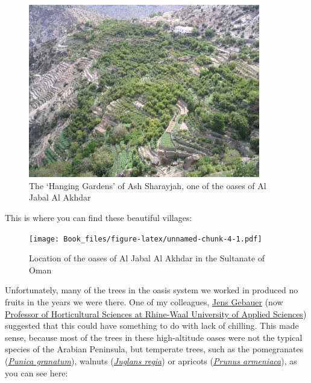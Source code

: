 \documentclass[
]{book}
\begin{document}
\begin{figure}
\centering
\includegraphics[width=0.9\textwidth,height=\textheight]{pictures/IMG_8538.JPG}
\caption{The `Hanging Gardens' of Ash Sharayjah, one of the oases of Al Jabal Al Akhdar}
\end{figure}

This is where you can find these beautiful villages:

\begin{figure}
\centering
\texttt{[image: Book\_files/figure-latex/unnamed-chunk-4-1.pdf]}
\caption{\label{fig:unnamed-chunk-4}Location of the oases of Al Jabal Al Akhdar in the Sultanate of Oman}
\end{figure}

Unfortunately, many of the trees in the oasis system we worked in produced no fruits in the years we were there. One of my colleagues, \href{https://scholar.google.de/citations?user=2UgqSrEAAAAJ\&hl=en\&oi=ao}{Jens Gebauer} (now \href{https://www.hochschule-rhein-waal.de/en/faculties/life-sciences/organisation/professors/prof-dr-habil-jens-gebauer}{Professor of Horticultural Sciences at Rhine-Waal University of Applied Sciences}) suggested that this could have something to do with lack of chilling. This made sense, because most of the trees in these high-altitude oases were not the typical species of the Arabian Peninsula, but temperate trees, such as the pomegranates (\href{https://en.wikipedia.org/wiki/Pomegranate}{\emph{Punica granatum}}), walnuts (\href{https://en.wikipedia.org/wiki/Walnut}{\emph{Juglans regia}}) or apricots (\href{https://en.wikipedia.org/wiki/Apricot}{\emph{Prunus armeniaca}}), as you can see here:
\end{document}
